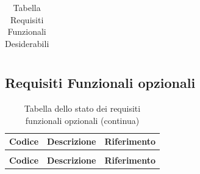 \documentclass[a4paper,12pt]{article}
\begin{document}
\begin{center}
\begin{longtable}{|c|p{8.5cm}|>{\centering\arraybackslash}p{4cm}|}
\caption{Tabella Requisiti Funzionali Desiderabili} \label{tab:requisiti_funzionali_desiderabili} \\
\end{longtable}
\end{center}


\subsection{Requisiti Funzionali opzionali} \label{subsection:requisiti_funzionali_opzionali}
\begin{center}
\renewcommand{\arraystretch}{1.5}
\begin{longtable}{|c|p{8.5cm}|>{\centering\arraybackslash}p{4cm}|}

\hline
\rowcolor{gray!60}
\textbf{Codice} & \textbf{Descrizione} & \textbf{Riferimento} \\
\hline
\endfirsthead
\caption[]{Tabella dello stato dei requisiti funzionali opzionali (continua)} \\
\hline
\rowcolor{gray!60}
\textbf{Codice} & \textbf{Descrizione} & \textbf{Riferimento} \\
\hline
\endhead


\end{longtable}
\end{center}
\end{document}
